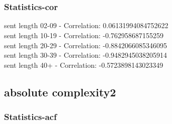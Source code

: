 \documentclass{article}%
\begin{document}
\begin{figure}[ht]%
\centering%
\setlength{\abovecaptionskip}{-35pt}%
%
%
\\%
%
%
\\%
%
\end{figure}

%
\newpage%
\subsubsection{Statistics{-}cor}%
\label{ssubsec:Statistics{-}cor}%
\noindent%
sent length 02-09 - Correlation: 0.06131994084752622\\%
sent length 10-19 - Correlation: -0.762958687155259\\%
sent length 20-29 - Correlation: -0.8842066085346095\\%
sent length 30-39 - Correlation: -0.9482945038205914\\%
sent length 40+ - Correlation: -0.5723898143023349\\

%
\newpage

%
\subsection{absolute complexity2}%
\label{subsec:absolutecomplexity2}%
\subsubsection{Statistics{-}acf}%
\label{ssubsec:Statistics{-}acf}%
\end{document}
